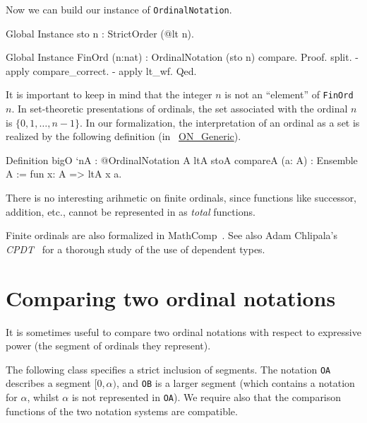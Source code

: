 Now we can build our instance of \texttt{OrdinalNotation}.

\begin{Coqsrc}
Global Instance sto n : StrictOrder (@lt n).

Global Instance FinOrd (n:nat) : OrdinalNotation (sto n) compare.
Proof.
  split.
  - apply compare_correct.
  - apply lt_wf.
Qed.
\end{Coqsrc}

\begin{remark}
It is important to keep in mind  that the integer $n$ is not an ``element'' of \texttt{FinOrd $n$}. In set-theoretic presentations of ordinals, the set associated with the ordinal $n$ is $\{0,1,\dots,n-1\}$. 
In our formalization, the interpretation of an ordinal as a set is realized by the following definition
(in ~\href{../theories/html/hydras.OrdinalNotations.ON_Generic.html}{ON\_Generic}).

\begin{Coqsrc}
Definition bigO `{nA : @OrdinalNotation A ltA stoA compareA}
           (a: A) : Ensemble A :=
  fun x: A => ltA x a.
\end{Coqsrc}
\end{remark}


\begin{remark}
 There is no interesting arihmetic on finite ordinals, since functions like successor, addition, etc.,  cannot be represented in \coq{} as \emph{total} functions.
\end{remark}

\begin{remark}
Finite ordinals are also formalized in MathComp~\cite{SSR}.  See also Adam Chlipala's \emph{CPDT}~\cite{chlipalacpdt2011} for a thorough study of the use of dependent types.  
\end{remark}




\section{Comparing two ordinal notations}

It is sometimes useful to compare two ordinal notations with respect to expressive power
(the segment of ordinals  they represent). 

The following class specifies a strict inclusion of segments. The notation \texttt{OA} describes a segment $[0,\alpha)$, and \texttt{OB} is a larger segment (which contains a notation for $\alpha$, whilst $\alpha$ is not represented in \texttt{OA}). We require also  that the comparison functions of the two notation systems are compatible.

